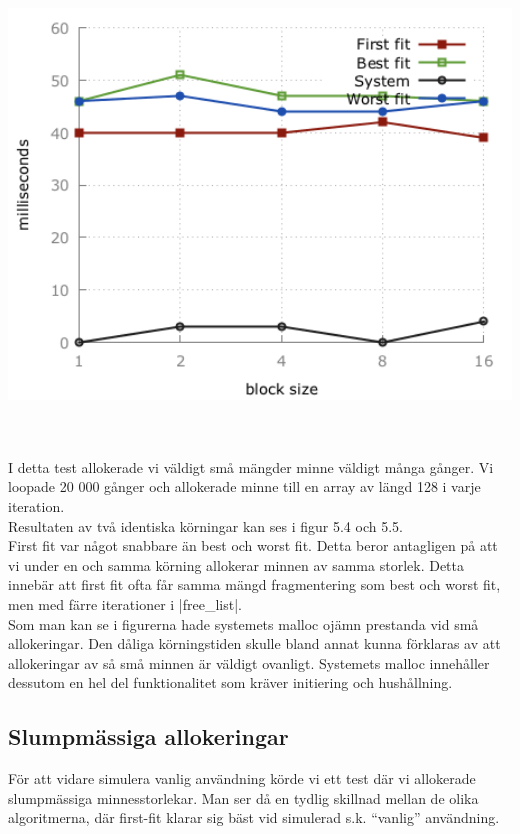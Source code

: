 \documentclass[paper=a4, fontsize=11pt]{scrartcl} %
\numberwithin{equation}{section} %
\numberwithin{figure}{section} %
\numberwithin{table}{section} %
\begin{document}
\begin{minipage}{.5\textwidth}
    \centering
    \includegraphics[width=1\textwidth]{images/time_plot_small2.png}
    \label{fig:small2}
\end{minipage}\\\\

I detta test allokerade vi väldigt små mängder minne väldigt många gånger.
Vi loopade 20 000 gånger och allokerade minne till en
array av längd 128 i varje iteration.\\
Resultaten av två identiska körningar kan ses i figur 5.4 och 5.5.\\

First fit var något snabbare än best och worst fit. Detta beror antagligen på
att vi under en och samma körning allokerar minnen av samma storlek. Detta 
innebär att first fit ofta får samma mängd fragmentering som best och worst fit,
men med färre iterationer i |free_list|.\\

Som man kan se i figurerna hade systemets malloc ojämn prestanda vid små allokeringar.
Den dåliga körningstiden skulle bland annat kunna förklaras av att allokeringar
av så små minnen är väldigt ovanligt.
Systemets malloc innehåller dessutom en hel del funktionalitet som kräver
initiering och hushållning.\\


\subsection{Slumpmässiga allokeringar}
För att vidare simulera vanlig användning körde vi ett test där vi allokerade
slumpmässiga minnesstorlekar.
Man ser då en tydlig skillnad mellan de olika algoritmerna, där first-fit
klarar sig bäst vid simulerad s.k. ``vanlig'' användning.\\
\end{document}
